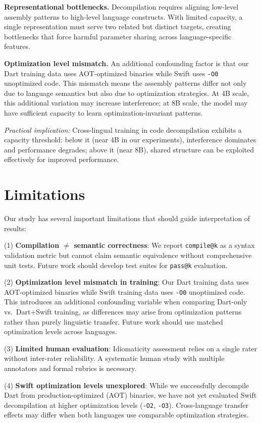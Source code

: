 \documentclass[10pt,conference]{IEEEtran}
\makeatletter
\newcommand{\compileatk}{\texttt{compile@k}\xspace}
\newcommand{\passatk}{\texttt{pass@k}\xspace}
\makeatother
\begin{document}
\textbf{Representational bottlenecks.} Decompilation requires aligning low-level assembly patterns to high-level language constructs. With limited capacity, a single representation must serve two related but distinct targets, creating bottlenecks that force harmful parameter sharing across language-specific features.

\textbf{Optimization level mismatch.} An additional confounding factor is that our Dart training data uses AOT-optimized binaries while Swift uses \texttt{-O0} unoptimized code. This mismatch means the assembly patterns differ not only due to language semantics but also due to optimization strategies. At 4B scale, this additional variation may increase interference; at 8B scale, the model may have sufficient capacity to learn optimization-invariant patterns.

\textit{Practical implication:} Cross-lingual training in code decompilation exhibits a capacity threshold: below it (near 4B in our experiments), interference dominates and performance degrades; above it (near 8B), shared structure can be exploited effectively for improved performance.

\section{Limitations}
\label{sec:limitations}
Our study has several important limitations that should guide interpretation of results:

(1) \textbf{Compilation $\neq$ semantic correctness}: We report \compileatk{} as a syntax validation metric but cannot claim semantic equivalence without comprehensive unit tests. Future work should develop test suites for \passatk{} evaluation.

(2) \textbf{Optimization level mismatch in training}: Our Dart training data uses AOT-optimized binaries while Swift training data uses \texttt{-O0} unoptimized code. This introduces an additional confounding variable when comparing Dart-only vs.\ Dart+Swift training, as differences may arise from optimization patterns rather than purely linguistic transfer. Future work should use matched optimization levels across languages.

(3) \textbf{Limited human evaluation}: Idiomaticity assessment relies on a single rater without inter-rater reliability. A systematic human study with multiple annotators and formal rubrics is necessary.

(4) \textbf{Swift optimization levels unexplored}: While we successfully decompile Dart from production-optimized (AOT) binaries, we have not yet evaluated Swift decompilation at higher optimization levels (\texttt{-O2}, \texttt{-O3}). Cross-language transfer effects may differ when both languages use comparable optimization strategies.
\end{document}
